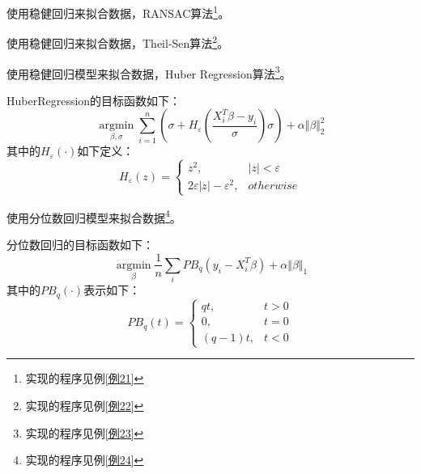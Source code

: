 \begin{Example}
	使用稳健回归来拟合数据，RANSAC算法\footnote{实现的程序见例\ref{例21}}。
\end{Example}

\begin{Example}
	使用稳健回归来拟合数据，Theil-Sen算法\footnote{实现的程序见例\ref{例22}}。
\end{Example}

\begin{Example}
	使用稳健回归模型来拟合数据，Huber Regression算法\footnote{实现的程序见例\ref{例23}}。

	HuberRegression的目标函数如下：
	\[
	\mathop{\arg\min}\limits_{\beta, \sigma}\sum^n_{i=1}(\sigma+H_{\varepsilon}(\dfrac{X^T_i\beta-y_i}{\sigma})\sigma)+\alpha\Vert \beta\Vert^2_2
	\]
	其中的$H_{\varepsilon}(\cdot)$如下定义：
	\[
		H_{\varepsilon}(z)=\left\{
			\begin{array}{lr}
				z^2,&\vert z\vert<\varepsilon\\
				2\varepsilon\vert z\vert-\varepsilon^2,&otherwise
		\end{array}\right.
	\]
\end{Example}

\begin{Example}
	使用分位数回归模型来拟合数据\footnote{实现的程序见例\ref{例24}}。

	分位数回归的目标函数如下：
	\[
	\mathop{\arg\min}\limits_{\beta}\dfrac{1}{n}\sum\limits_i PB_{q}(y_i-X^T_i\beta)+\alpha\Vert\beta\Vert_1
	\]
	其中的$PB_{q}(\cdot)$表示如下：
	\[
	PB_{q}(t)=\left\{
		\begin{array}{lr}
			qt,&t>0\\
			0,&t=0\\
			(q-1)t,&t<0
		\end{array}
	\right.
	\]
\end{Example}
